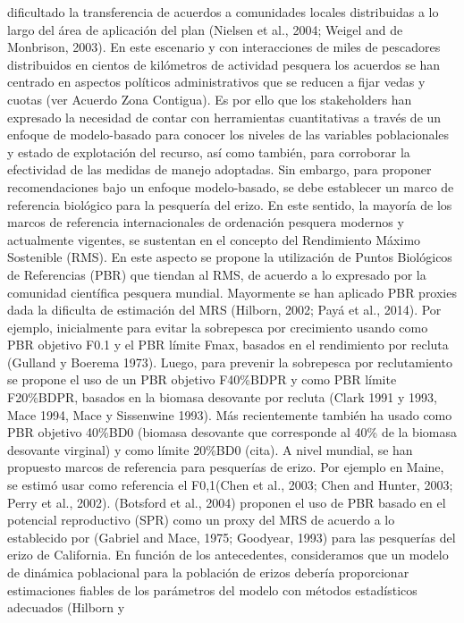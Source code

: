 \documentclass[
]{article}
\begin{document}
dificultado la transferencia de acuerdos a comunidades locales
distribuidas a lo largo del área de aplicación del plan (Nielsen et al.,
2004; Weigel and de Monbrison, 2003). En este escenario y con
interacciones de miles de pescadores distribuidos en cientos de
kilómetros de actividad pesquera los acuerdos se han centrado en
aspectos políticos administrativos que se reducen a fijar vedas y cuotas
(ver Acuerdo Zona Contigua). Es por ello que los stakeholders han
expresado la necesidad de contar con herramientas cuantitativas a través
de un enfoque de modelo-basado para conocer los niveles de las variables
poblacionales y estado de explotación del recurso, así como también,
para corroborar la efectividad de las medidas de manejo adoptadas. Sin
embargo, para proponer recomendaciones bajo un enfoque modelo-basado, se
debe establecer un marco de referencia biológico para la pesquería del
erizo. En este sentido, la mayoría de los marcos de referencia
internacionales de ordenación pesquera modernos y actualmente vigentes,
se sustentan en el concepto del Rendimiento Máximo Sostenible (RMS). En
este aspecto se propone la utilización de Puntos Biológicos de
Referencias (PBR) que tiendan al RMS, de acuerdo a lo expresado por la
comunidad científica pesquera mundial. Mayormente se han aplicado PBR
proxies dada la dificulta de estimación del MRS (Hilborn, 2002; Payá et
al., 2014). Por ejemplo, inicialmente para evitar la sobrepesca por
crecimiento usando como PBR objetivo F0.1 y el PBR límite Fmax, basados
en el rendimiento por recluta (Gulland y Boerema 1973). Luego, para
prevenir la sobrepesca por reclutamiento se propone el uso de un PBR
objetivo F40\%BDPR y como PBR límite F20\%BDPR, basados en la biomasa
desovante por recluta (Clark 1991 y 1993, Mace 1994, Mace y Sissenwine
1993). Más recientemente también ha usado como PBR objetivo 40\%BD0
(biomasa desovante que corresponde al 40\% de la biomasa desovante
virginal) y como límite 20\%BD0 (cita). A nivel mundial, se han
propuesto marcos de referencia para pesquerías de erizo. Por ejemplo en
Maine, se estimó usar como referencia el F0,1(Chen et al., 2003; Chen
and Hunter, 2003; Perry et al., 2002). (Botsford et al., 2004) proponen
el uso de PBR basado en el potencial reproductivo (SPR) como un proxy
del MRS de acuerdo a lo establecido por (Gabriel and Mace, 1975;
Goodyear, 1993) para las pesquerías del erizo de California. En función
de los antecedentes, consideramos que un modelo de dinámica poblacional
para la población de erizos debería proporcionar estimaciones fiables de
los parámetros del modelo con métodos estadísticos adecuados (Hilborn y
\end{document}
